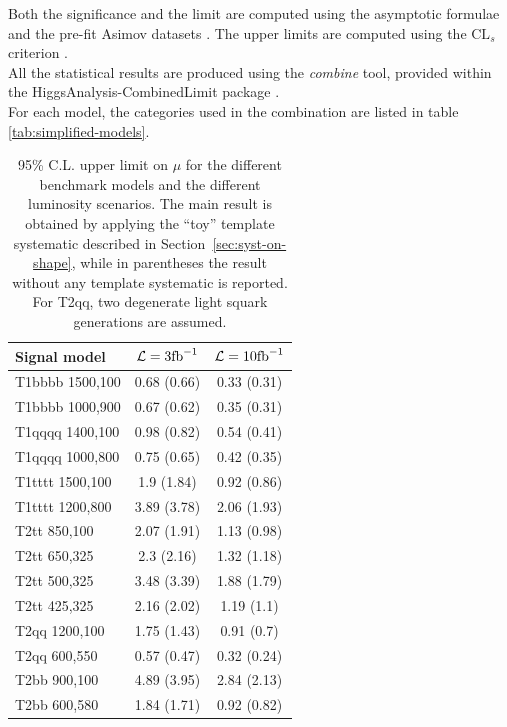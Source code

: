 Both the significance and the limit are computed using the asymptotic formulae and the pre-fit Asimov datasets \cite{AsymptoticFormulae}. 
The upper limits are computed using the $\text{CL}_{s}$ criterion \cite{CLsTechnique}. \\
All the statistical results are produced using the \textit{combine} tool, 
provided within the HiggsAnalysis-CombinedLimit package \cite{Combine}. \\
For each model, the categories used in the combination are listed in table \ref{tab:simplified-models}. 

\begin{table}
  \centering
  \caption{95\% C.L. upper limit on $\mu$ for the different benchmark models and the different luminosity scenarios. 
  The main result is obtained by applying 
  the ``toy'' template systematic described in Section~\ref{sec:syst-on-shape}, 
while in parentheses the result without any template systematic is reported. 
For T2qq, two degenerate light squark generations are assumed.}
  \label{tab:results_ul}
  \footnotesize
  \begin{tabular}{lcc}
    \hline
    \hline
    Signal model & $\mathcal{L} = 3 \text{fb}^{-1}$ & $\mathcal{L} = 10 \text{fb}^{-1}$ \\
    \hline
    \hline
    T1bbbb 1500,100  & 0.68 (0.66) & 0.33 (0.31) \\ 
    T1bbbb 1000,900  & 0.67 (0.62) & 0.35 (0.31) \\ 
    T1qqqq 1400,100  & 0.98 (0.82) & 0.54 (0.41) \\ 
    T1qqqq 1000,800  & 0.75 (0.65) & 0.42 (0.35) \\ 
    T1tttt 1500,100  & 1.9 (1.84) & 0.92 (0.86) \\  
    T1tttt 1200,800  & 3.89 (3.78) & 2.06 (1.93) \\ \hline
    T2tt 850,100     & 2.07 (1.91) & 1.13 (0.98) \\ 
    T2tt 650,325     & 2.3 (2.16) & 1.32 (1.18) \\  
    T2tt 500,325     & 3.48 (3.39) & 1.88 (1.79) \\ 
    T2tt 425,325     & 2.16 (2.02) & 1.19 (1.1) \\  
    T2qq 1200,100    & 1.75 (1.43) & 0.91 (0.7) \\  
    T2qq 600,550     & 0.57 (0.47) & 0.32 (0.24) \\ 
    T2bb 900,100     & 4.89 (3.95) & 2.84 (2.13) \\ 
    T2bb 600,580     & 1.84 (1.71) & 0.92 (0.82) \\ 
    \hline
    \hline
  \end{tabular} 
\end{table}



